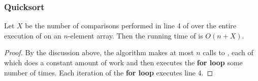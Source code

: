 \documentclass[UTF8,11pt,handout]{beamer}
\begin{document}
\begin{frame}[t]
\frametitle{Quicksort}
\begin{center}	
	\begin{lemma}[7.1]
		Let {\color{blue}$X$} be the number of comparisons performed in line 4 of  over the entire execution of  on an $n$-element array. Then the running time of  is {\color{blue}$O(n+X)$}. 
	\end{lemma}
	\begin{proof}
		 By the discussion above, the algorithm makes at most {\color{blue}$n$} calls to , each of which does a constant amount of work and then executes the \textbf{\color{blue}for loop}  some number of times. Each iteration of the \textbf{\color{blue}for loop}  executes line $4$.
	\end{proof}
\end{center}
\end{frame}
\end{document}
